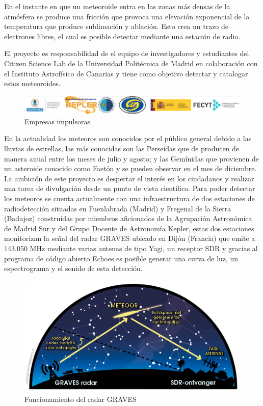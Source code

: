En el instante en que un meteoroide entra en las zonas más densas de la atmósfera se produce una fricción que provoca una elevación exponencial de la temperatura que produce sublimación y ablación. 
Esto crea un trazo de electrones libres, el cual es posible detectar mediante una estación de radio.

El proyecto es responsabilidad de el equipo de investigadores y estudiantes del Citizen Science Lab de la Universidad Politécnica de Madrid en colaboración con el Instituto Astrofísico de Canarias y tiene como objetivo detectar y catalogar estos meteoroides.


\vspace{0.5cm}

\begin{figure} [h]
    \centering
    \includegraphics[width=\textwidth]{include/figuras/Empresas_proyecto.png}
    \caption{Empresas impulsoras}
    \label{fig:empresas}
\end{figure}

En la actualidad los meteoros son conocidos por el público general debido a las lluvias de estrellas, las más conocidas son las Perseídas que de producen de manera anual entre los meses de julio y agosto; y las Gemínidas que provienen de un asteroide conocido como Faetón y se pueden observar en el mes de diciembre. La ambición de este proyecto es despertar el interés en los ciudadanos y realizar una tarea de divulgación desde un punto de vista científico. 
Para poder detectar los meteoros se cuenta actualmente con una infraestructura de dos estaciones de radiodetección situadas en Fuenlabrada (Madrid) y Fregenal de la Sierra (Badajoz) construidas por miembros aficionados de la Agrupación Astronómica de Madrid Sur y del Grupo Docente de Astronomía Kepler, estas dos estaciones monitorizan la señal del radar GRAVES \cite{graves} ubicado en Dijón (Francia) que emite a 143.050 MHz mediante varias antenas de tipo Yagi, un receptor SDR \cite{ulversoy2010software} y gracias al programa de código abierto Echoes \cite{echoes} es posible generar una curva de luz, un espectrograma y el sonido de esta detección. 

\begin{figure} [h]
    \centering
    \includegraphics[scale=0.40]{include/figuras/Radar.jpg}
    \caption{Funcionamiento del radar GRAVES}
    \label{fig:radar}
\end{figure}

